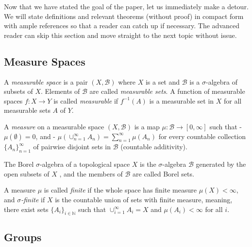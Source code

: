 \documentclass[
  12pt
]{article}
\theoremstyle{plain}
\begin{document}
  Now that we have stated the goal of the paper, let us immediately make a
  detour. We will state definitions and relevant theorems (without proof)
  in compact form with ample references so that a reader can catch up if
  necessary. The advanced reader can skip this section and move straight
  to the next topic without issue.




  \hypertarget{measure-spaces}{%
  \subsection{Measure Spaces}\label{measure-spaces}}

  A \emph{measurable space} is a pair $(X, \mathscr{B})$ where $X$ is
  a set and $\mathscr{B}$ is a $\sigma$-algebra of subsets of $X$.
  Elements of $\mathscr{B}$ are called \emph{measurable sets}. A
  function of measurable spaces $f: X \rightarrow Y$ is called
  \emph{measurable} if $f^{-1}(A)$ is a measurable set in $X$ for all
  measurable sets $A$ of $Y$.

  A \emph{measure} on a measurable space $(X, \mathscr{B})$ is a map
  $\mu: \mathscr{B} \rightarrow [0, \infty]$ such that -
  $\mu(\emptyset) = 0$, and -
  $\mu(\cup_{n=1}^{\infty} A_n) = \sum_{n=1}^{\infty} \mu(A_n)$ for
  every countable collection $\{A_n\}_{n=1}^{\infty}$ of pairwise
  disjoint sets in $\mathscr{B}$ (countable additivity).

  The Borel $\sigma$-algebra of a topological space $X$ is the
  $\sigma$-algebra $\mathscr{B}$ generated by the open subsets of
  $X$ , and the members of $\mathscr{B}$ are called Borel sets. 

  A measure $\mu$ is called \emph{finite} if the whole space has finite measure $\mu(X) < \infty $,
  and \emph{$\sigma$-finite} if $X$ is the countable union of sets with finite measure,
  meaning, there exist sets $\{A_i\}_{i\in \mathbb{N}}$ such that $\cup_{i=1}^{\infty} A_i = X$ and
  $\mu(A_i) < \infty $ for all $i$.




  \hypertarget{groups}{%
  \subsection{Groups}\label{groups}}
\end{document}
